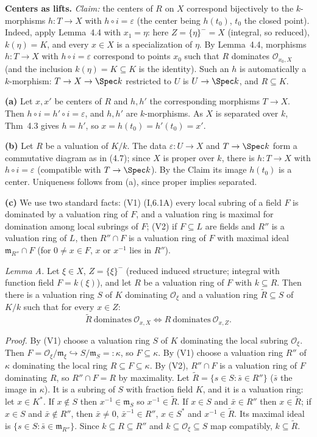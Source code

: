 \documentclass[11pt]{article}
\begin{document}
\textbf{Centers as lifts.} \emph{Claim:} the centers of $R$ on $X$ correspond bijectively to the $k$-morphisms $h:T\to X$ with $h\circ i=\varepsilon$ (the center being $h(t_0)$, $t_0$ the closed point). Indeed, apply Lemma~4.4 with $x_1=\eta$: here $Z=\{\eta\}^-=X$ (integral, so reduced), $k(\eta)=K$, and every $x\in X$ is a specialization of $\eta$. By Lemma~4.4, morphisms $h:T\to X$ with $h\circ i=\varepsilon$ correspond to points $x_0$ such that $R$ dominates $\mathcal O_{x_0,X}$ (and the inclusion $k(\eta)=K\subseteq K$ is the identity). Such an $h$ is automatically a $k$-morphism: $T\to X\to\Spec k$ restricted to $U$ is $U\to\Spec k$, and $R\subseteq K$.

\textbf{(a)} Let $x,x'$ be centers of $R$ and $h,h'$ the corresponding morphisms $T\to X$. Then $h\circ i=h'\circ i=\varepsilon$, and $h,h'$ are $k$-morphisms. As $X$ is separated over $k$, Thm~4.3 gives $h=h'$, so $x=h(t_0)=h'(t_0)=x'$.

\textbf{(b)} Let $R$ be a valuation of $K/k$. The data $\varepsilon:U\to X$ and $T\to\Spec k$ form a commutative diagram as in (4.7); since $X$ is proper over $k$, there is $h:T\to X$ with $h\circ i=\varepsilon$ (compatible with $T\to\Spec k$). By the Claim its image $h(t_0)$ is a center. Uniqueness follows from (a), since proper implies separated.

\textbf{(c)} We use two standard facts: (V1) (I,6.1A) every local subring of a field $F$ is dominated by a valuation ring of $F$, and a valuation ring is maximal for domination among local subrings of $F$; (V2) if $F\subseteq L$ are fields and $R''$ is a valuation ring of $L$, then $R''\cap F$ is a valuation ring of $F$ with maximal ideal $\mathfrak m_{R''}\cap F$ (for $0\ne x\in F$, $x$ or $x^{-1}$ lies in $R''$).

\emph{Lemma A.} Let $\xi\in X$, $Z=\{\xi\}^-$ (reduced induced structure; integral with function field $F=k(\xi)$), and let $R$ be a valuation ring of $F$ with $k\subseteq R$. Then there is a valuation ring $S$ of $K$ dominating $\mathcal O_\xi$ and a valuation ring $\tilde R\subseteq S$ of $K/k$ such that for every $x\in Z$:
\[
\tilde R\ \text{dominates}\ \mathcal O_{x,X}\iff R\ \text{dominates}\ \mathcal O_{x,Z}.
\]

\emph{Proof.} By (V1) choose a valuation ring $S$ of $K$ dominating the local subring $\mathcal O_\xi$. Then $F=\mathcal O_\xi/\mathfrak m_\xi\hookrightarrow S/\mathfrak m_S=:\kappa$, so $F\subseteq\kappa$. By (V1) choose a valuation ring $R''$ of $\kappa$ dominating the local ring $R\subseteq F\subseteq\kappa$. By (V2), $R''\cap F$ is a valuation ring of $F$ dominating $R$, so $R''\cap F=R$ by maximality. Let $\tilde R=\{s\in S:\bar s\in R''\}$ ($\bar s$ the image in $\kappa$). It is a subring of $S$ with fraction field $K$, and it is a valuation ring: let $x\in K^*$. If $x\notin S$ then $x^{-1}\in\mathfrak m_S$ so $x^{-1}\in\tilde R$. If $x\in S$ and $\bar x\in R''$ then $x\in\tilde R$; if $x\in S$ and $\bar x\notin R''$, then $\bar x\neq0$, $\bar x^{-1}\in R''$, $x\in S^*$ and $x^{-1}\in\tilde R$. Its maximal ideal is $\{s\in S:\bar s\in\mathfrak m_{R''}\}$. Since $k\subseteq R\subseteq R''$ and $k\subseteq\mathcal O_\xi\subseteq S$ map compatibly, $k\subseteq\tilde R$.
\end{document}
